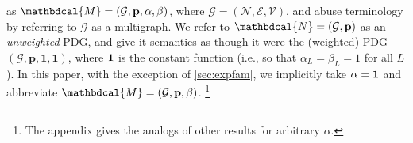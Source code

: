\documentclass[letterpaper]{article} %
\theoremstyle{plain}
\theoremstyle{definition}
\theoremstyle{remark}
\newcommand\mat[1]{\mathbf{#1}}
\newcommand{\V}{\mathcal V}
\newcommand{\N}{\mathcal N}
\newcommand{\Ed}{\mathcal E}
\newcommand{\dg}[1]{\mathbdcal{#1}}
\newcommand{\Gr}{\mathcal G}
\begin{document}
\begin{defn}
as $\dg M = (\Gr,\mat p, \alpha,\beta)$, where $\Gr = (\N,\Ed,\V)$, and
abuse terminology by referring to $\Gr$ as a multigraph.
We refer to 
${\dg N} = (\Gr, \mat p)$ as an \emph{unweighted} PDG,
and give it semantics as though it were the (weighted) PDG $(\Gr, \mat p, \mat 1, \mat 1)$, where
$\bf 1$ is the constant function (i.e., so that $\alpha_L = \beta_L = 1$ for all $L$). 
%
%
In this paper, with the exception of \cref{sec:expfam},  we implicitly take $\alpha = {\bf 1}$
and abbreviate $\dg M = (\Gr, \mat p, \beta)$.%
	\footnote{The appendix gives the analogs of other results for arbitrary $\alpha$.}
% 
\end{defn}
\end{document}
